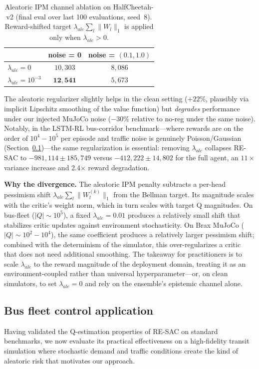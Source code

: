 \documentclass[10pt]{article}
\begin{document}
\begin{table}[!htbp]
\centering
\caption{Aleatoric IPM channel ablation on HalfCheetah-v2 (final eval over last 100 evaluations, seed~8). Reward-shifted target $\lambda_{ale}\sum_l\|W_l\|_1$ is applied only when $\lambda_{ale}>0$.}
\label{tab:ipm_validation}
\begin{tabular}{l|cc}
\toprule
 & noise = 0 & noise = $(0.1,1.0)$ \\
\midrule
$\lambda_{ale}=0$        & $10{,}303$ & $8{,}086$ \\
$\lambda_{ale}=10^{-3}$  & $\mathbf{12{,}541}$ & $5{,}673$ \\
\bottomrule
\end{tabular}
\end{table}

The aleatoric regularizer slightly helps in the clean setting ($+22\%$, plausibly via implicit Lipschitz smoothing of the value function) but \emph{degrades} performance under our injected MuJoCo noise ($-30\%$ relative to no-reg under the same noise). Notably, in the LSTM-RL bus-corridor benchmark---where rewards are on the order of $10^4{-}10^5$ per episode and traffic noise is genuinely Poisson/Gaussian (Section~\ref{sec:bus_experiments})---the same regularization is essential: removing $\lambda_{ale}$ collapses RE-SAC to $-981{,}114\pm 185{,}749$ versus $-412{,}222\pm 14{,}802$ for the full agent, an $11{\times}$ variance increase and 2.4$\times$ reward degradation.

\textbf{Why the divergence.} The aleatoric IPM penalty subtracts a per-head pessimism shift $\lambda_{ale}\sum_l\|W_l^{(k)}\|_1$ from the Bellman target. Its magnitude scales with the critic's weight norm, which in turn scales with target Q magnitudes. On bus-fleet ($|Q|\sim 10^5$), a fixed $\lambda_{ale}{=}0.01$ produces a relatively small shift that stabilizes critic updates against environment stochasticity. On Brax MuJoCo ($|Q|\sim 10^2{-}10^4$), the same coefficient produces a relatively larger pessimism shift; combined with the determinism of the simulator, this over-regularizes a critic that does not need additional smoothing. The takeaway for practitioners is to scale $\lambda_{ale}$ to the reward magnitude of the deployment domain, treating it as an environment-coupled rather than universal hyperparameter—or, on clean simulators, to set $\lambda_{ale}{=}0$ and rely on the ensemble's epistemic channel alone.

\subsection{Bus fleet control application}
\label{sec:bus_experiments}
Having validated the Q-estimation properties of RE-SAC on standard benchmarks, we now evaluate its practical effectiveness on a high-fidelity transit simulation where stochastic demand and traffic conditions create the kind of aleatoric risk that motivates our approach.
\end{document}
